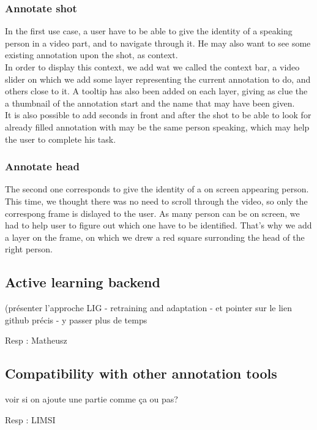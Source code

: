 \documentclass[a4paper]{article}
\begin{document}
\subsubsection{Annotate shot}
In the first use case, a user have to be able to give the identity of a speaking person in a video part, and to navigate through it. He may also want to see some existing annotation upon the shot, as context.\\
In order to display this context, we add wat we called the context bar, a video slider on which we add some layer representing the current annotation to do, and others close to it. A tooltip has also been added on each layer, giving as clue the a thumbnail of the annotation start and the name that may have been given.\\
It is also possible to add seconds in front and after the shot to be able to look for already filled annotation with may be the same person speaking, which may help the user to complete his task.

\subsubsection{Annotate head}
The second one corresponds to give the identity of a on screen appearing person. This time, we thought there was no need to scroll through the video, so only the correspong frame is dislayed to the user. As many person can be on screen, we had to help user to figure out which one have to be identified. That's why we add a layer on the frame, on which we drew a red square surronding the head of the right person.\\


      \subsection{Active learning backend}
(présenter l'approche LIG - retraining and adaptation - et pointer sur le lien github précis - y passer plus de temps 

Resp : Matheusz

      \subsection{Compatibility with other annotation tools}
voir si on ajoute une partie comme ça ou pas?

Resp : LIMSI
\end{document}
